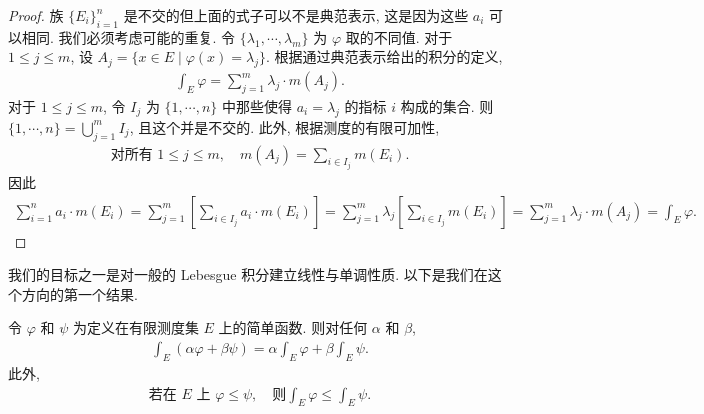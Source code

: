 \documentclass[../../main.tex]{subfiles}
\begin{document}
\begin{proof}
族 $\{E_{i}\}_{i=1}^{n}$ 是不交的但上面的式子可以不是典范表示, 这是因为这些 $a_{i}$ 可以相同. 我们必须考虑可能的重复. 令 $\{\lambda_{1},\cdots,\lambda_{m}\}$ 为 $\varphi$ 取的不同值. 对于 $1\leqslant j\leqslant m$, 设 $A_{j}=\{x\in E\mid\varphi(x)=\lambda_{j}\}$. 根据通过典范表示给出的积分的定义,
\begin{align*}
\int_{E}\varphi=\sum_{j=1}^{m}\lambda_{j}\cdot m(A_{j}).
\end{align*}
对于 $1\leqslant j\leqslant m$, 令 $I_{j}$ 为 $\{1,\cdots,n\}$ 中那些使得 $a_{i}=\lambda_{j}$ 的指标 $i$ 构成的集合. 则 $\{1,\cdots,n\}=\bigcup_{j=1}^{m}I_{j}$, 且这个并是不交的. 此外, 根据测度的有限可加性,
\begin{align*}
\text{对所有 }1\leqslant j\leqslant m,\quad m(A_{j})=\sum_{i\in I_{j}}m(E_{i}).
\end{align*}
因此
\begin{align*}
\sum_{i=1}^{n}a_{i}\cdot m(E_{i})=\sum_{j=1}^{m}\left[\sum_{i\in I_{j}}a_{i}\cdot m(E_{i})\right]=\sum_{j=1}^{m}\lambda_{j}\left[\sum_{i\in I_{j}}m(E_{i})\right]=\sum_{j=1}^{m}\lambda_{j}\cdot m(A_{j})=\int_{E}\varphi.
\end{align*}
\end{proof}

我们的目标之一是对一般的 Lebesgue 积分建立线性与单调性质. 以下是我们在这个方向的第一个结果.

\begin{proposition}[积分的线性与单调性]\label{proposition:ch04-简单积分线性}
令 $\varphi$ 和 $\psi$ 为定义在有限测度集 $E$ 上的简单函数. 则对任何 $\alpha$ 和 $\beta$,
\begin{align*}
\int_{E}(\alpha\varphi+\beta\psi)=\alpha\int_{E}\varphi+\beta\int_{E}\psi.
\end{align*}
此外,
\begin{align*}
\text{若在 }E\text{ 上 }\varphi\leqslant\psi,\quad\text{则}\int_{E}\varphi\leqslant\int_{E}\psi.
\end{align*}
\end{proposition}
\end{document}
